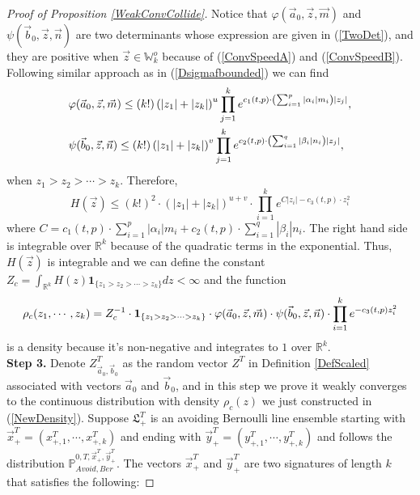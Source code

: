 \begin{proof}[Proof of Proposition \ref{WeakConvCollide}]
Notice that $\varphi(\vec{a}_{0},\vec{z},\vec{m})$ and $\psi(\vec{b}_{0},\vec{z},\vec{n})$ are two determinants whose expression are given in (\ref{TwoDet}), and they are positive when $\vec{z}\in\mathbb{W}_{k}^{o}$ because of (\ref{ConvSpeedA}) and (\ref{ConvSpeedB}). Following similar approach as in (\ref{Dsigmafbounded}) we can find
\begin{equation}{\label{phipsibounded}}
	\begin{split}
		&\varphi(\vec{a}_0,\vec{z},\vec{m})\leq (k!)\left(|z_1|+|z_k|\right)^{u}\prod_{j=1}^{k}e^{c_1(t,p)\cdot\left(\sum_{i=1}^{p}|\alpha_{i}|m_i\right)|z_j|},\\ 
		&\psi(\vec{b}_0,\vec{z},\vec{n})\leq (k!)\left(|z_1|+|z_k|\right)^{v}\prod_{j=1}^{k}e^{c_2(t,p)\cdot\left(\sum_{i=1}^{q}|\beta_{i}|n_i\right)|z_j|},
	\end{split}
\end{equation}
when $z_1>z_2>\cdots>z_k$. Therefore,
\begin{equation}
	H(\vec{z})\leq (k!)^2\cdot \left(|z_1|+|z_k|\right)^{u+v}\cdot\prod_{i=1}^{k}e^{C|z_i|-c_3(t,p)\cdot z_{i}^2}
\end{equation}
where $C=c_1(t,p)\cdot\sum_{i=1}^{p}|\alpha_{i}|m_i+c_2(t,p)\cdot\sum_{i=1}^{q}|\beta_{i}|n_i$. The right hand side is integrable over $\mathbb{R}^{k}$ because of the quadratic terms in the exponential. Thus, $H(\vec{z})$ is integrable and we can define the constant $Z_{c}=\int_{\mathbb{R}^{k}}H(z)\mathbf{1}_{\{z_1>z_2>\cdots>z_{k}\}}dz<\infty$ and the function 
\begin{equation}{\label{NewDensity}}
\rho_{c}(z_{1},\cdots,z_{k})=Z_{c}^{-1}\cdot\mathbf{1}_{\{z_1>z_2>\cdots>z_{k}\}}\cdot\varphi(\vec{a}_{0},\vec{z},\vec{m})\cdot\psi(\vec{b}_{0},\vec{z},\vec{n})\cdot\prod_{i=1}^{k}e^{-c_{3}(t,p)z_{i}^{2}}
\end{equation}
is a density because it's non-negative and integrates to $1$ over $\mathbb{R}^{k}$.\\
\textbf{Step 3. }Denote $Z^{T}_{\vec{a}_{0},\vec{b}_{0}}$ as the random vector $Z^{T}$ in Definition \ref{DefScaled} associated with vectors $\vec{a}_{0}$ and $\vec{b}_{0}$, and in this step we prove it weakly converges to the continuous distribution with density $\rho_{c}(z)$ we just constructed in (\ref{NewDensity}). Suppose $\mathfrak{L}_{+}^{T}$ is an avoiding Bernoulli line ensemble starting with $\vec{x}^{T}_{+}=\left(x^{T}_{+,1},\cdots,x^{T}_{+,k}\right)$ and ending with $\vec{y}^{T}_{+}=\left(y^{T}_{+,1},\cdots,y^{T}_{+,k}\right)$ and follows the distribution $\mathbb{P}_{Avoid,Ber}^{0,T,\vec{x}^{T}_{+},\vec{y}^{T}_{+}}$. The vectors $\vec{x}^{T}_{+}$ and $\vec{y}^{T}_{+}$ are two signatures of length $k$ that satisfies the following:

\end{proof}
